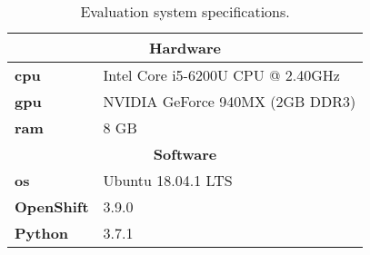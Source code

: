 \documentclass[draft,final]{vutinfth} %
\begin{document}
\begin{table}[]
	\caption{Evaluation system specifications.}
	\centering
	\begin{tabular}{l|l}
		\multicolumn{2}{c}{\textbf{Hardware}} \\ \hline
		\textbf{\acrshort{cpu}} & Intel Core i5-6200U CPU @ 2.40GHz \\ 
		\textbf{\acrshort{gpu}} & NVIDIA GeForce 940MX (2GB DDR3)  \\ 
		\textbf{\acrshort{ram}} & 8 GB  \\ 
		\multicolumn{2}{c}{\textbf{Software}} \\ \hline
		\textbf{\acrshort{os}} & Ubuntu 18.04.1 LTS \\ 
		\textbf{OpenShift} & 3.9.0  \\ 
		\textbf{Python} & 3.7.1  \\ 
	\end{tabular}
	\label{Tab:eva_hardware}
\end{table}
\end{document}
